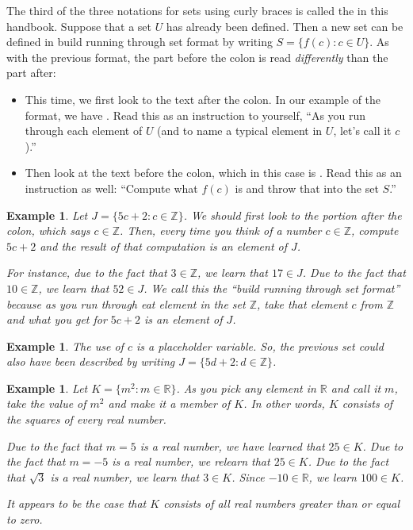 \documentclass{book}
\newcounter{ekcounter}%
\theoremstyle{ekimcustom}
\newtheorem{example}[ekcounter]{Example}
\newcommand\defn[1]{{\color{blue}{\bf #1}}}
\begin{document}
The third of the three notations for sets using curly braces is called the \defn{build running through set format} in this handbook. Suppose that a set $U$ has already been defined. Then a new set can be defined in build running through set format by writing $S = \{f(c) : c \in U \}$. As with the previous format, the part before the colon is read \emph{differently} than the part after:
\begin{itemize}
\item This time, we first look to the text after the colon. In our example of the format, we have . Read this as an instruction to yourself, ``As you run through each element of $U$ (and to name a typical element in $U$, let's call it $c$).''
\item Then look at the text before the colon, which in this case is . Read this as an instruction as well: ``Compute what $f(c)$ is and throw that into the set $S$.''
\end{itemize}
\begin{example}\label{example:J5cplus2}
Let $J = \{ 5c + 2 : c \in \mathbb{Z}\}$. We should first look to the portion after the colon, which says $c \in \mathbb{Z}$. Then, every time you think of a number $c \in \mathbb{Z}$, compute $5c+2$ and the result of that computation is an element of $J$.

For instance, due to the fact that $3 \in \mathbb{Z}$, we learn that $17 \in J$. Due to the fact that $10 \in \mathbb{Z}$, we learn that $52 \in J$. We call this the ``build running through set format'' because as you run through eat element in the set $\mathbb{Z}$, take that element $c$ from $\mathbb{Z}$ and what you get for $5c+2$ is an element of $J$.
\end{example}
\begin{example}
The use of $c$ is a placeholder variable. So, the previous set could also have been described by writing $J = 
 \{ 5d + 2 : d \in \mathbb{Z}\}$.
\end{example}
\begin{example}\label{example:KmsquaredmR}
Let $K = \{ m^2 : m \in \mathbb{R}\}$. As you pick any element in $\mathbb{R}$ and call it $m$, take the value of $m^2$ and make it a member of $K$. In other words, $K$ consists of the squares of every real number.

Due to the fact that $m=5$ is a real number, we have learned that $25 \in K$. Due to the fact that $m=-5$ is a real number, we relearn that $25 \in K$. Due to the fact that $\sqrt{3}$ is a real number, we learn that $3 \in K$. Since $-10 \in \mathbb{R}$, we learn $100 \in K$.

It appears to be the case that $K$ consists of all real numbers greater than or equal to zero.
\end{example}
\end{document}
